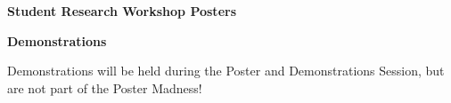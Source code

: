 \noindent
\vspace{1em}\par\centerline{\bfseries\large Student Research Workshop Posters}\vspace{1em}\par
\noindent


\noindent
\vspace{1em}\par\centerline{\bfseries\large Demonstrations}\vspace{1em}\par
{}

Demonstrations will be held during the Poster and Demonstrations Session, but are not part of the
Poster Madness!

\noindent

